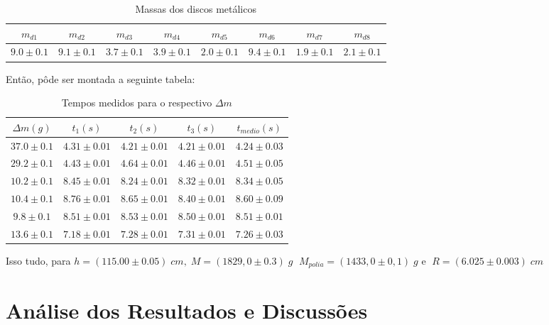 \documentclass[12pt,a4paper]{article}
\begin{document}
\begin{table}[!htbp]
\centering
\caption{Massas dos discos metálicos}
\def\arraystretch{1.3}
\begin{tabular}{|c|c|c|c|c|c|c|c|}
\hline 
$m_{d1}$ & $m_{d2}$ & $m_{d3}$ & $m_{d4}$ & $m_{d5}$ & $m_{d6}$ & $m_{d7}$ & $m_{d8}$\\ 
\hline 
$9.0 \pm 0.1$ & $9.1 \pm 0.1$ & $3.7 \pm 0.1$ & $3.9 \pm 0.1$ & $2.0 \pm 0.1$ & $9.4 \pm 0.1$ & $1.9 \pm 0.1$ & $2.1 \pm 0.1$\\ 
\hline
\end{tabular} 
\label{MassaDiscos}
\end{table}

Então, pôde ser montada a seguinte tabela:

\newpage

\begin{table}[!htbp]
\centering
\caption{Tempos medidos para o respectivo $\Delta m$}
\def\arraystretch{1.3}

\begin{tabular}{|c|c|c|c|c|}

\hline 
$\Delta m (g)$ & $t_1 (s)$ & $t_2 (s)$ & $t_3 (s)$ & $t_{medio} (s)$ \\ 
\hline 
$37.0 \pm 0.1$ & $4.31 \pm 0.01$ & $4.21 \pm 0.01$ & $4.21 \pm 0.01$ & $4.24 \pm 0.03$ \\ 
\hline 
$29.2 \pm 0.1$ & $4.43 \pm 0.01$ & $4.64 \pm 0.01$ & $4.46 \pm 0.01$ & $4.51 \pm 0.05$ \\ 
\hline 
$10.2 \pm 0.1$ & $8.45 \pm 0.01$ & $8.24 \pm 0.01$ & $8.32 \pm 0.01$ & $8.34 \pm 0.05$ \\ 
\hline 
$10.4 \pm 0.1$ & $8.76 \pm 0.01$ & $8.65 \pm 0.01$ & $8.40 \pm 0.01$ & $8.60 \pm 0.09$ \\ 
\hline 
$9.8 \pm 0.1$ & $8.51 \pm 0.01$ & $8.53 \pm 0.01$ & $8.50 \pm 0.01$ & $8.51 \pm 0.01$ \\ 
\hline 
$13.6 \pm 0.1$ & $7.18 \pm 0.01$ & $7.28 \pm 0.01$ & $7.31 \pm 0.01$ & $7.26 \pm 0.03$ \\ 
\hline 

\end{tabular} 
\label{Tempos}
\end{table}

Isso tudo, para $h = (115.00 \pm 0.05) \; cm, \; M = (1829,0 \pm 0.3) \; g \;$ $ M_{polia} = (1433,0 \pm 0,1)  \; g $ e  $\; R = (6.025 \pm 0.003) \; cm$

\section{Análise dos Resultados e Discussões}
\end{document}

